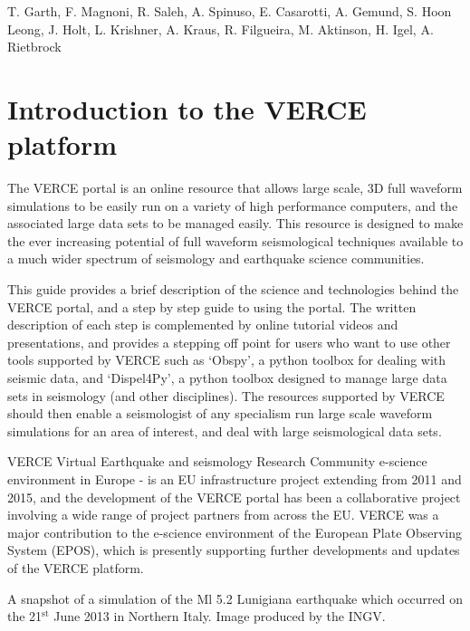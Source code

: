 \documentclass[english]{book}
\begin{document}
T. Garth, F. Magnoni, R. Saleh, A. Spinuso, E. Casarotti, A. Gemund, S.
Hoon Leong, J. Holt, L. Krishner, A. Kraus, R. Filgueira, M. Aktinson,
H. Igel, A. Rietbrock


\sphinxtableofcontents

\chapter{Introduction to the VERCE platform}
\label{\detokenize{Section1::doc}}
\label{\detokenize{Section1:introduction-to-the-verce-platform}}
The VERCE portal is an online resource that allows large scale, 3D full
waveform simulations to be easily run on a variety of high performance
computers, and the associated large data sets to be managed easily. This
resource is designed to make the ever increasing potential of full
waveform seismological techniques available to a much wider spectrum of
seismology and earthquake science communities.

This guide provides a brief description of the science and technologies
behind the VERCE portal, and a step by step guide to using the portal.
The written description of each step is complemented by online tutorial
videos and presentations, and provides a stepping off point for users
who want to use other tools supported by VERCE such as ‘Obspy’, a python
toolbox for dealing with seismic data, and ‘Dispel4Py’, a python toolbox
designed to manage large data sets in seismology (and other
disciplines). The resources supported by VERCE should then enable a
seismologist of any specialism run large scale waveform simulations for
an area of interest, and deal with large seismological data sets.

VERCE \textendash{} Virtual Earthquake and seismology Research Community e-science
environment in Europe - is an EU infrastructure project extending from
2011 and 2015, and the development of the VERCE portal has been a
collaborative project involving a wide range of project partners from
across the EU. VERCE was a major contribution to the e-science
environment of the European Plate Observing System (EPOS), which is
presently supporting further developments and updates of the VERCE
platform.


 A snapshot of a simulation of the Ml 5.2 Lunigiana
earthquake which occurred on the 21$^{\text{st}}$ June 2013 in Northern
Italy. Image produced by the INGV.
\end{document}
